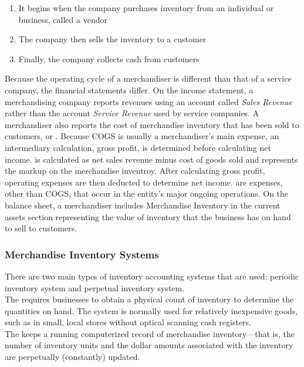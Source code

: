 \documentclass{article}
\begin{document}
\begin{enumerate}
  \item It begins when the company purchases inventory from an individual or business, called a vendor 
  \item The company then sells the inventory to a customer 
  \item Finally, the company collects cash from customers 
\end{enumerate}

Because the operating cycle of a merchandiser is different than that of a service company, the financial statements differ. On the income statement, a merchandising company reports revenues using an account called \emph{Sales Revenue} rather than the account \emph{Service Revenue} used by service companies. A merchandiser also reports the cost of merchandise inventory that has been sold to customers, or . Because COGS is usually a merchandiser's main expense, an intermediary calculation, gross profit, is determined before calculating net income.  is calculated as net sales revenue minus cost of goods sold and represents the markup on the merchandise inventroy. After calculating gross profit, operating expenses are then deducted to determine net income.  are expenses, other than COGS, that occur in the entity's major ongoing operations. On the balance sheet, a merchandiser includes Merchandise Inventory in the current assets section representing the value of inventory that the business has on hand to sell to customers. 

\subsubsection{Merchandise Inventory Systems}

There are two main types of inventory accounting systems that are used: periodic inventory system and perpetual inventory system. \\ 

The  requires businesses to obtain a physical count of inventory to determine the quantities on hand. The system is normally used for relatively inexpensive goods, such as in small, local stores without optical scanning cash registers. \\ 

The  keeps a running computerized record of merchandise inventory---that is, the number of inventory units and the dollar amounts associated with the inventory are perpetually (constantly) updated. 
\end{document}
